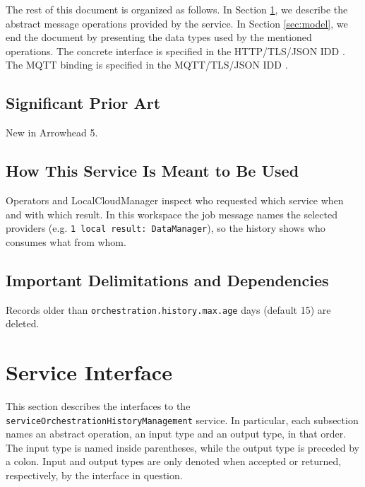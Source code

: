 \documentclass[a4paper]{arrowhead}
\begin{document}
The rest of this document is organized as follows.
In Section \ref{sec:operations}, we describe the abstract message operations provided by the service.
In Section \ref{sec:model}, we end the document by presenting the data types used by the mentioned operations.
The concrete interface is specified in the HTTP/TLS/JSON IDD \cite{dso-serviceOrchestrationHistoryManagement-http-idd}. The MQTT binding is specified in the MQTT/TLS/JSON IDD \cite{dso-serviceOrchestrationHistoryManagement-mqtt-idd}.

\subsection{Significant Prior Art}

New in Arrowhead 5.

\subsection{How This Service Is Meant to Be Used}

Operators and LocalCloudManager inspect who requested which service when and with which result. In this workspace the job message names the selected providers (e.g. \texttt{1 local result: Data\allowbreak{}Manager}), so the history shows who consumes what from whom.

\subsection{Important Delimitations and Dependencies}
\label{sec:delimitations}

Records older than \texttt{orchestration.\allowbreak{}history.\allowbreak{}max.\allowbreak{}age} days (default 15) are deleted.

\newpage

\section{Service Interface}
\label{sec:operations}

This section describes the interfaces to the \texttt{service\allowbreak{}Orchestration\allowbreak{}History\allowbreak{}Management} service.
In particular, each subsection names an abstract operation, an input type and an output type, in that order.
The input type is named inside parentheses, while the output type is preceded by a colon.
Input and output types are only denoted when accepted or returned, respectively, by the interface in question.
\end{document}

